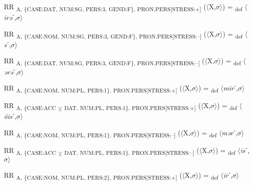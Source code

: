{\begin{exe}
 RR \textsubscript{A, \{CASE:DAT, NUM:SG, PERS:3, GEND:F\}, PRON.PERS[STRESS:+]} ($\langle$X,$\sigma $$\rangle$) = \textsubscript{def} $\langle$\textit{irə}ˊ,$\sigma $$\rangle$
\end{exe}

\begin{exe}
 RR \textsubscript{A, \{CASE:NOM, NUM:SG, PERS:3, GEND:F\}, PRON.PERS[STRESS:–]} ($\langle$X,$\sigma $$\rangle$) = \textsubscript{def} $\langle$\textit{s}ˊ,$\sigma $$\rangle$
\end{exe}

\begin{exe}
 RR \textsubscript{A, \{CASE:DAT, NUM:SG, PERS:3, GEND:F\}, PRON.PERS[STRESS:–]} ($\langle$X,$\sigma $$\rangle$) = \textsubscript{def} $\langle$\textit{ərə}ˊ,$\sigma $$\rangle$
\end{exe}

\begin{exe}
 RR \textsubscript{A, \{CASE:NOM, NUM:PL, PERS:1\}, PRON.PERS[STRESS:+]} ($\langle$X,$\sigma $$\rangle$) = \textsubscript{def} $\langle$\textit{mir}ˊ,$\sigma $$\rangle$
\end{exe}

\begin{exe}
 RR \textsubscript{A, \{CASE:ACC} \textsubscript{${\veebar}$}\textsubscript{ DAT, NUM:PL, PERS:1\}, PRON.PERS[STRESS:+]} ($\langle$X,$\sigma $$\rangle$) = \textsubscript{def} $\langle$\textit{öis}ˊ,$\sigma $$\rangle$
\end{exe}

\begin{exe}
 RR \textsubscript{A, \{CASE:NOM, NUM:PL, PERS:1\}, PRON.PERS[STRESS:–]} ($\langle$X,$\sigma $$\rangle$) = \textsubscript{def} $\langle$\textit{mər}ˊ,$\sigma $$\rangle$
\end{exe}

\begin{exe}
 RR \textsubscript{A, \{CASE:ACC} \textsubscript{${\veebar}$}\textsubscript{ DAT, NUM:PL, PERS:1\}, PRON.PERS[STRESS:–]} ($\langle$X,$\sigma $$\rangle$) = \textsubscript{def} $\langle$\textit{is}ˊ,$\sigma $$\rangle$
\end{exe}

\begin{exe}
 RR \textsubscript{A, \{CASE:NOM, NUM:PL, PERS:2\}, PRON.PERS[STRESS:+]} ($\langle$X,$\sigma $$\rangle$) = \textsubscript{def} $\langle$\textit{ir}ˊ,$\sigma $$\rangle$
\end{exe}

}
